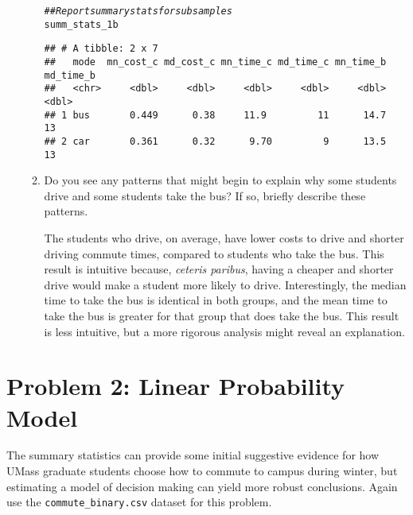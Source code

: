 \documentclass[11pt,letterpaper]{article}\usepackage[]{graphicx}\usepackage[]{xcolor}
\makeatletter
\newcommand{\hlcom}[1]{\textcolor[rgb]{0.678,0.584,0.686}{\textit{#1}}}%
\newcommand{\hlstd}[1]{\textcolor[rgb]{0.345,0.345,0.345}{#1}}%
\newenvironment{kframe}{%
 \def\at@end@of@kframe{}%
 \ifinner\ifhmode%
  \def\at@end@of@kframe{\end{minipage}}%
  \begin{minipage}{\columnwidth}%
 \fi\fi%
 \def\FrameCommand##1{\hskip\@totalleftmargin \hskip-\fboxsep
 \colorbox{shadecolor}{##1}\hskip-\fboxsep
     \hskip-\linewidth \hskip-\@totalleftmargin \hskip\columnwidth}%
 \MakeFramed {\advance\hsize-\width
   \@totalleftmargin\z@ \linewidth\hsize
   \@setminipage}}%
 {\par\unskip\endMakeFramed%
 \at@end@of@kframe}
\newenvironment{knitrout}{}{} %
\makeatother
\begin{document}
\begin{enumerate}[label=\alph*., leftmargin=*]
\begin{enumerate}[label=\roman*.]
\begin{knitrout}
\color{fgcolor}\begin{kframe}
\begin{alltt}
    \hlcom{## Report summary stats for subsamples}
    \hlstd{summ_stats_1b}
\end{alltt}
\begin{verbatim}
## # A tibble: 2 x 7
##   mode  mn_cost_c md_cost_c mn_time_c md_time_c mn_time_b md_time_b
##   <chr>     <dbl>     <dbl>     <dbl>     <dbl>     <dbl>     <dbl>
## 1 bus       0.449      0.38     11.9         11      14.7        13
## 2 car       0.361      0.32      9.70         9      13.5        13
\end{verbatim}
\end{kframe}
\end{knitrout}

		\item Do you see any patterns that might begin to explain why some students drive and some students take the bus? If so, briefly describe these patterns.

		The students who drive, on average, have lower costs to drive and shorter driving commute times, compared to students who take the bus. This result is intuitive because, \emph{ceteris paribus}, having a cheaper and shorter drive would make a student more likely to drive. Interestingly, the median time to take the bus is identical in both groups, and the mean time to take the bus is greater for that group that does take the bus. This result is less intuitive, but a more rigorous analysis might reveal an explanation.
	\end{enumerate}
\end{enumerate}

\section*{Problem 2: Linear Probability Model}

The summary statistics can provide some initial suggestive evidence for how UMass graduate students choose how to commute to campus during winter, but estimating a model of decision making can yield more robust conclusions. Again use the \texttt{commute\_binary.csv} dataset for this problem.
\end{document}
